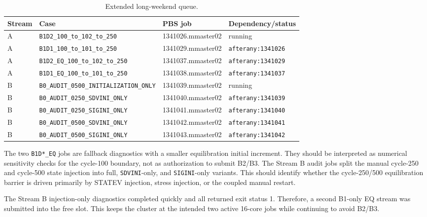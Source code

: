 \documentclass[11pt,a4paper]{article}
\newcommand{\code}[1]{\texttt{#1}}
\begin{document}
\begin{table}[H]
\centering
\caption{Extended long-weekend queue.}
\begin{tabular}{llll}
\toprule
Stream & Case & PBS job & Dependency/status \\
\midrule
A & \code{B1D2\_100\_to\_102\_to\_250} & 1341026.mmaster02 & running \\
A & \code{B1D1\_100\_to\_101\_to\_250} & 1341029.mmaster02 & \code{afterany:1341026} \\
A & \code{B1D2\_EQ\_100\_to\_102\_to\_250} & 1341037.mmaster02 & \code{afterany:1341029} \\
A & \code{B1D1\_EQ\_100\_to\_101\_to\_250} & 1341038.mmaster02 & \code{afterany:1341037} \\
B & \code{B0\_AUDIT\_0500\_INITIALIZATION\_ONLY} & 1341039.mmaster02 & running \\
B & \code{B0\_AUDIT\_0250\_SDVINI\_ONLY} & 1341040.mmaster02 & \code{afterany:1341039} \\
B & \code{B0\_AUDIT\_0250\_SIGINI\_ONLY} & 1341041.mmaster02 & \code{afterany:1341040} \\
B & \code{B0\_AUDIT\_0500\_SDVINI\_ONLY} & 1341042.mmaster02 & \code{afterany:1341041} \\
B & \code{B0\_AUDIT\_0500\_SIGINI\_ONLY} & 1341043.mmaster02 & \code{afterany:1341042} \\
\bottomrule
\end{tabular}
\end{table}

The two \code{B1D*\_EQ} jobs are fallback diagnostics with a smaller equilibration initial increment. They should be interpreted as numerical sensitivity checks for the cycle-100 boundary, not as authorization to submit B2/B3. The Stream B audit jobs split the manual cycle-250 and cycle-500 state injection into full, \code{SDVINI}-only, and \code{SIGINI}-only variants. This should identify whether the cycle-250/500 equilibration barrier is driven primarily by STATEV injection, stress injection, or the coupled manual restart.

The Stream B injection-only diagnostics completed quickly and all returned exit status 1. Therefore, a second B1-only EQ stream was submitted into the free slot. This keeps the cluster at the intended two active 16-core jobs while continuing to avoid B2/B3.
\end{document}
